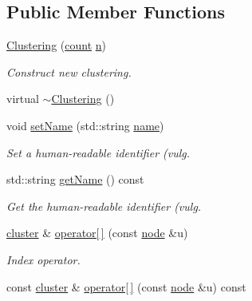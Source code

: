\subsection*{Public Member Functions}
\begin{DoxyCompactItemize}
\item 
\hyperlink{class_networ_kit_1_1_clustering_a9df7e0e888aa4e1f4f7a1138e63ca468}{Clustering} (\hyperlink{namespace_networ_kit_ad4c536a5339a8bf2f91f418b9a67a7d8}{count} \hyperlink{class_networ_kit_1_1_index_map_aabb9796ff1a0c002446b14ff7d4fffbc}{n})
\begin{DoxyCompactList}\small\item\em Construct new clustering. \end{DoxyCompactList}\item 
virtual \hyperlink{class_networ_kit_1_1_clustering_afbc84dc6577e2ee74c48c790bc61a7b4}{$\sim$\-Clustering} ()
\item 
void \hyperlink{class_networ_kit_1_1_clustering_a5be82c60354b7e9652df63567ad7de63}{set\-Name} (std\-::string \hyperlink{class_networ_kit_1_1_clustering_af87d62813784536f46ed1582317d05f5}{name})
\begin{DoxyCompactList}\small\item\em Set a human-\/readable identifier (vulg. \end{DoxyCompactList}\item 
std\-::string \hyperlink{class_networ_kit_1_1_clustering_a3229e9863df6727cd2900e4418295e7e}{get\-Name} () const 
\begin{DoxyCompactList}\small\item\em Get the human-\/readable identifier (vulg. \end{DoxyCompactList}\item 
\hyperlink{namespace_networ_kit_aee72806475c8d37642866ab18aceab8b}{cluster} \& \hyperlink{class_networ_kit_1_1_clustering_ad6152fce1c5e9be7906895495e7faa6e}{operator\mbox{[}$\,$\mbox{]}} (const \hyperlink{namespace_networ_kit_a61914158fd771265be48de9942369160}{node} \&u)
\begin{DoxyCompactList}\small\item\em Index operator. \end{DoxyCompactList}\item 
const \hyperlink{namespace_networ_kit_aee72806475c8d37642866ab18aceab8b}{cluster} \& \hyperlink{class_networ_kit_1_1_clustering_aae9dd5303831724e62081bf4d4f9ff07}{operator\mbox{[}$\,$\mbox{]}} (const \hyperlink{namespace_networ_kit_a61914158fd771265be48de9942369160}{node} \&u) const 

\end{DoxyCompactItemize}
